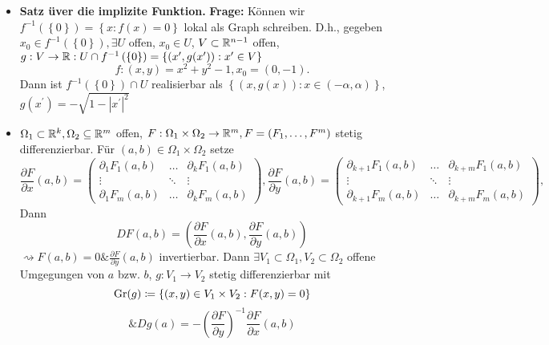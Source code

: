 \begin{itemize}
	\item \textbf{Satz üver die implizite Funktion.}
		\textbf{Frage:} Können wir $ f^{-1} \left( \left\{ 0 \right\}  \right) = \left\{ x : f\left( x \right) = 0 \right\}  $ lokal als Graph schreiben.
		D.h., gegeben $ x_0 \in f^{-1} \left( \left\{ 0 \right\}  \right) , \exists U $ offen, $ x_0 \in U $, $ V \subset \mathbb{R} ^{n - 1}  $ offen, $ g : V \to \mathbb{R} : U \cap f^{-1} \left( \left\{ 0 \right\}  \right) = \left\{ \left( x^\prime , g(x^\prime ) \right) : x^\prime \in V \right\}  $ 
		\[
			f: (x, y) = x^2 + y^2 - 1, x_0 = \left( 0, -1 \right) .
		\]
		Dann ist $ f^{-1} \left( \left\{ 0 \right\}  \right) \cap U $ realisierbar als $ \left\{ \left( x, g(x) \right) : x \in \left( -\alpha, \alpha \right)  \right\}  $, $ g\left( x^\prime  \right) = - \sqrt{1 - \left| x^\prime  \right| ^2}  $
	\item $ \Omega_1 \subset \mathbb{R} ^k, \Omega_2 \subseteq \mathbb{R} ^m $ offen, $ F: \Omega_1 \times \Omega_2 \to \mathbb{R} ^m, F = \left( F_1, \dotsc, F^m \right)  $ stetig differenzierbar.
		Für $ (a, b) \in \Omega_1 \times \Omega_2 $ setze
		\[
			\frac{ \partial F }{ \partial x } (a, b) =
			\begin{pmatrix} 
				\partial_1 F_1(a, b) & \hdots & \partial_k F_1(a, b) \\
				\vdots & \ddots & \vdots \\
				\partial_1 F_m(a, b) & \hdots & \partial_k F_m(a, b)
			\end{pmatrix}, 
			\frac{ \partial F }{ \partial y } (a, b) =
			\begin{pmatrix} 
				\partial_{k + 1}  F_1(a, b) & \hdots & \partial_{k + m}  F_1(a, b) \\
				\vdots & \ddots & \vdots \\
				\partial_{k + 1}  F_m(a, b) & \hdots & \partial_{k + m}  F_m(a, b)
			\end{pmatrix}, 
		\]
		Dann
		\[
			DF(a, b) = \left( \frac{\partial F}{ \partial x } \left( a, b \right) , \frac{ \partial F }{ \partial y } (a, b)  \right) 
		\]
		$ \rightsquigarrow F(a, b) = 0 \& \frac{ \partial F }{ \partial y } (a, b) $ invertierbar.
		Dann $ \exists V_1 \subset \Omega_1, V_2 \subset \Omega_2 $ offene Umgegungen von $ a $ bzw. $ b $, $ g : V_1 \to V_2 $ stetig differenzierbar mit
		\[ 
			\operatorname{Gr}(g) \coloneqq \left\{ (x, y) \in V_1 \times V_2 : F(x, y) = 0 \right\}
		\]
		\[
			\& Dg(a) = - \left( \frac{\partial F }{ \partial y }  \right) ^{-1} \frac{ \partial F }{ \partial x } (a, b)
		\]
\end{itemize}

